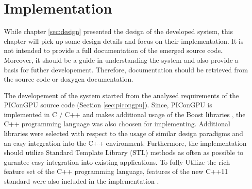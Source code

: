 \chapter{Implementation}
\label{sec:implementation}


While chapter \ref{sec:design} presented the design of the developed
system, this chapter will pick up some design details and focus on
their implementation.  It is not intended to provide a full
documentation of the emerged source code. Moreover, it should be a
guide in understanding the system and also provide a basis for futher
developement. Therefore, documentation should be retrieved from the
source code or doxygen \cite{ref:doxygen} documentation.

The developement of the system started from the analysed requirements
of the PIConGPU source code (Section \ref{sec:picongpu}). Since,
PIConGPU is implemented in C / C++ and makes additional usage of the
Boost libraries \cite{ref:boost}, the C++ programming language was
also choosen for implementing. Additional libraries were selected with
respect to the usage of similar design paradigms and an easy
integration into the C++ environment. Furthermore, the implementation
should utilize Standard Template Library (STL) methods as often as
possible to gurantee easy integration into existing applications.  To
fully Utilize the rich feature set of the C++ programming language,
features of the new C++11 standard were also included in the
implementation \cite{ref:c++11}.

